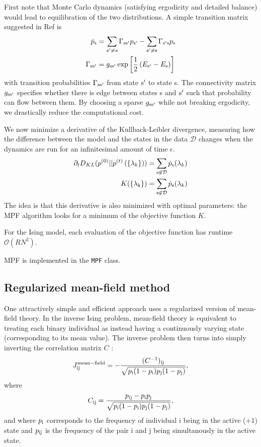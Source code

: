 \documentclass[aps,prl,twocolumn,nofootinbib]{revtex4-1}
\begin{document}
First note that Monte Carlo dynamics (satisfying ergodicity and detailed balance) would lead to equilibration of the two distributions. A simple transition matrix suggested in Ref \cite{SohlDickstein:2011im} is
\begin{align}
	\dot{p}_{\rm s} &= \sum_{s'\neq s} \Gamma_{\rm ss'} p_{\rm s'} -\sum_{\rm s'\neq s} \Gamma_{\rm s's} p_{\rm s}\\
	\Gamma_{\rm ss'} &= g_{\rm ss'}\exp\left[ \frac{1}{2}\left( E_{\rm s'}-E_{\rm s} \right) \right]
\end{align}
with transition probabilities $\Gamma_{\rm ss'}$ from state ${\rm s'}$ to state s. The connectivity matrix $g_{\rm ss'}$ specifies whether there is edge between states s and ${\rm s'}$ such that probability can flow between them. By choosing a sparse $g_{\rm ss'}$ while not breaking ergodicity, we drastically reduce the computational cost.

We now minimize a derivative of the Kullback-Leibler divergence, measuring how the difference between the model and the states in the data $\mathcal{D}$ changes when the dynamics are run for an infinitesimal amount of time $\epsilon$.
\begin{align}
	\partial_t D_{KL}(p^{(0)}||p^{(t)}\left(\{\lambda_k\}\right)) &= \sum_{\rm s \not\in \mathcal{D}} \dot{p}_{\rm s}(\lambda_k)\\
	K(\{\lambda_{\rm k}\}) &= \sum_{\rm s \not\in \mathcal{D}} \dot{p}_{\rm s}(\lambda_k)
\end{align}
The idea is that this derivative is also minimized with optimal parameters: the MPF algorithm looks for a minimum of the objective function $K$.


For the Ising model, each evaluation of the objective function has runtime $\mathcal{O}(RN^2)$.

MPF is implemented in the {\tt MPF} class.

\subsection{Regularized mean-field method}
One attractively simple and efficient approach uses a regularized version of
mean-field theory.  In the inverse Ising problem, mean-field theory is equivalent
to treating each binary individual as instead having a continuously varying state
(corresponding to its mean value).  The inverse problem then turns into simply inverting
the correlation matrix $C$ \cite{CocMon12}:
\begin{equation}
\label{meanFieldSolution}
J^{\mathrm{mean-field}}_{\rm ij} =
    - \frac{ (C^{-1})_{\rm ij} }{ \sqrt{p_{\rm i}(1-p_{\rm i})p_{\rm j}(1-p_{\rm j})} },
\end{equation}
where
\begin{equation}
C_{\rm ij} = \frac{ p_{\rm ij} - p_{\rm i} p_{\rm j} }{ \sqrt{p_{\rm i}(1-p_{\rm i})p_{\rm j}(1-p_{\rm j})} },
\end{equation}
and where $p_{\rm i}$ corresponds to the frequency of individual i being
in the active ($+1$) state and $p_{\rm ij}$ is the frequency of the pair
i and j being simultanously in the active state.
\end{document}
